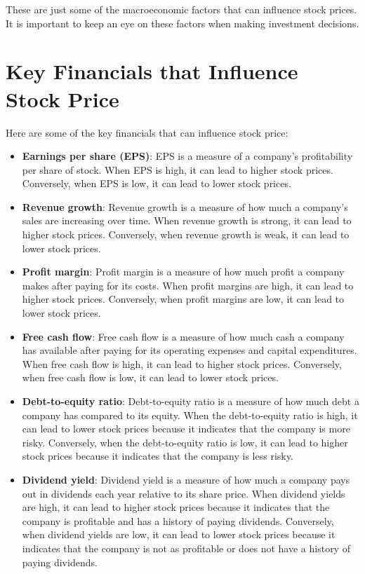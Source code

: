 These are just some of the macroeconomic factors that can influence stock prices. It is important to keep an eye on these factors when making investment decisions.

\section{Key Financials that Influence Stock Price}

Here are some of the key financials that can influence stock price:

\begin{itemize}
\item \textbf{Earnings per share (EPS)}: EPS is a measure of a company's profitability per share of stock. When EPS is high, it can lead to higher stock prices. Conversely, when EPS is low, it can lead to lower stock prices.
\item \textbf{Revenue growth}: Revenue growth is a measure of how much a company's sales are increasing over time. When revenue growth is strong, it can lead to higher stock prices. Conversely, when revenue growth is weak, it can lead to lower stock prices.
\item \textbf{Profit margin}: Profit margin is a measure of how much profit a company makes after paying for its costs. When profit margins are high, it can lead to higher stock prices. Conversely, when profit margins are low, it can lead to lower stock prices.
\item \textbf{Free cash flow}: Free cash flow is a measure of how much cash a company has available after paying for its operating expenses and capital expenditures. When free cash flow is high, it can lead to higher stock prices. Conversely, when free cash flow is low, it can lead to lower stock prices.
\item \textbf{Debt-to-equity ratio}: Debt-to-equity ratio is a measure of how much debt a company has compared to its equity. When the debt-to-equity ratio is high, it can lead to lower stock prices because it indicates that the company is more risky. Conversely, when the debt-to-equity ratio is low, it can lead to higher stock prices because it indicates that the company is less risky.
\item \textbf{Dividend yield}: Dividend yield is a measure of how much a company pays out in dividends each year relative to its share price. When dividend yields are high, it can lead to higher stock prices because it indicates that the company is profitable and has a history of paying dividends. Conversely, when dividend yields are low, it can lead to lower stock prices because it indicates that the company is not as profitable or does not have a history of paying dividends.
\end{itemize}

